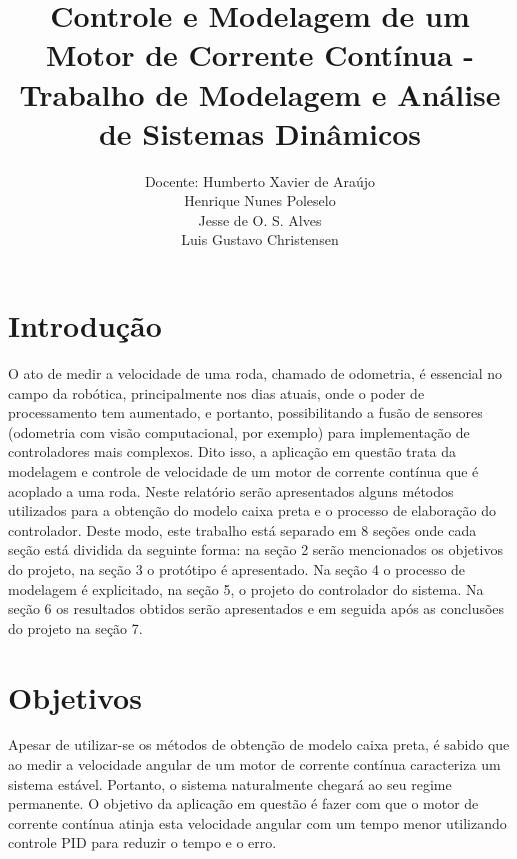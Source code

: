 \documentclass{article}
\title{Controle e Modelagem de um Motor de Corrente Contínua - Trabalho de Modelagem e Análise de Sistemas Dinâmicos}
\author{
  Docente: Humberto Xavier de Araújo \\
  \And
  Henrique Nunes Poleselo \\
   \And
 Jesse de O. S. Alves \\
  \And
  Luis Gustavo Christensen
}
\begin{document}
\maketitle

\section{Introdução}

O ato de medir a velocidade de uma roda, chamado de odometria, é essencial no campo da robótica, principalmente nos dias atuais, onde o poder de processamento tem aumentado, e portanto, possibilitando a fusão de sensores (odometria com visão computacional, por exemplo) para implementação de controladores mais complexos. Dito isso, a aplicação em questão trata da modelagem e controle de velocidade de um motor de corrente contínua que é acoplado a uma roda. Neste relatório serão apresentados alguns métodos utilizados para a obtenção do modelo caixa preta e o processo de elaboração do controlador.
Deste modo, este trabalho está separado em 8 seções onde cada seção está dividida da seguinte forma: na seção 2 serão mencionados os objetivos do projeto, na seção 3 o protótipo é apresentado. Na seção 4 o processo de modelagem é explicitado, na seção 5, o projeto do controlador do sistema. Na seção 6 os resultados obtidos serão apresentados e em seguida após as conclusões do projeto na seção 7. 


\section{Objetivos}
Apesar de utilizar-se os métodos de obtenção de modelo caixa preta, é sabido que ao medir a velocidade angular de um motor de corrente contínua caracteriza um sistema estável. Portanto, o sistema naturalmente chegará ao seu regime permanente. O objetivo da aplicação em questão é fazer com que o motor de corrente contínua atinja esta velocidade angular com um tempo menor utilizando controle PID para reduzir o tempo e o erro.
\end{document}
